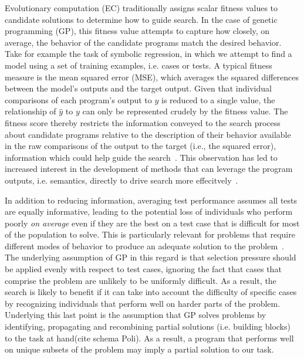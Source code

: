 \documentclass[twoside]{article}
\begin{document}
Evolutionary computation (EC) traditionally assigns scalar fitness values to candidate solutions to determine how to guide search. In the case of genetic programming (GP), this fitness value attempts to capture how closely, on average, the behavior of the candidate programs match the desired behavior. Take for example the task of symbolic regression, in which we attempt to find a model using a set of training examples, i.e. cases or tests. A typical fitness measure is the mean squared error (MSE), which averages the squared differences between the model's outputs and the target output. Given that individual comparisons of each program's output to $y$ is reduced to a single value, the relationship of $\hat{y}$ to $y$ can only be represented crudely by the fitness value. The fitness score thereby restricts the information conveyed to the search process about candidate programs relative to the description of their behavior available in the raw comparisons of the output to the target (i.e., the squared error), information which could help guide the search~\citep{krawiec_automatic_2015}. This observation has led to increased interest in the development of methods that can leverage the program outputs, i.e. semantics, directly to drive search more effecitvely~\citep{vanneschi_survey_2014}.

In addition to reducing information, averaging test performance assumes all tests are equally informative, leading to the potential loss of individuals who perform poorly {\it on average} even if they are the best on a test case that is difficult for most of the population to solve. This is particularly relevant for problems that require different modes of behavior to produce an adequate solution to the problem~\citep{spector_assessment_2012}. The underlying assumption of GP in this regard is that selection pressure should be applied evenly with respect to test cases, ignoring the fact that cases that comprise the problem are unlikely to be uniformly difficult. As a result, the search is likely to benefit if it can take into account the difficulty of specific cases by recognizing individuals that perform well on harder parts of the problem. Underlying this last point is the assumption that GP solves problems by identifying, propagating and recombining partial solutions (i.e. building blocks) to the task at hand(cite schema Poli). As a result, a program that performs well on unique subsets of the problem may imply a partial solution to our task. 
\end{document}
